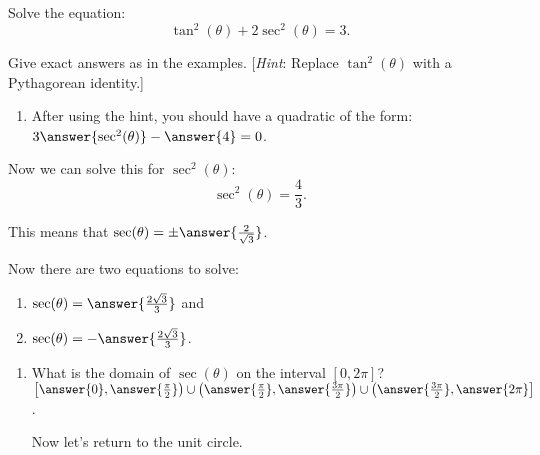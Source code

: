 \documentclass{ximera}
\author{Elizabeth Campolongo}
\begin{document}
\begin{exercise}
Solve the equation:
$$\tan^2(\theta) + 2\sec^2(\theta)=3.$$

Give exact answers as in the examples. [\textit{Hint}: Replace $\tan^2(\theta)$ with a Pythagorean identity.]

\begin{enumerate}
\item After using the hint, you should have a quadratic of the form: \smallskip\\

 $3\answer{\sec^2(\theta)} -\answer{4} = 0$.
 \end{enumerate}
\begin{exercise}
Now we can solve this for $\sec^2(\theta)$:
$$
\sec^2(\theta) = \frac{4}{3}. 
$$

This means that $\sec(\theta) = \pm\answer{\frac{2}{\sqrt{3}}}$.

\begin{exercise}
Now there are two equations to solve:
\begin{enumerate}
\item $\sec(\theta) = \answer{\frac{2\sqrt{3}}{3}}$ and

\item $\sec(\theta) = -\answer{\frac{2\sqrt{3}}{3}}$.
\end{enumerate}

\begin{exercise}
\begin{enumerate}
\item What is the domain of $\sec(\theta)$ on the interval $[0, 2\pi]$?\smallskip \\
$\left[\answer{0},\answer{\frac{\pi}{2}}\right) \cup \left(\answer{\frac{\pi}{2}}, \answer{\frac{3\pi}{2}}\right) \cup \left(\answer{\frac{3\pi}{2}},\answer{2\pi}\right]$.


\bigskip
Now let's return to the unit circle. 
\begin{image}
\end{image}
\end{enumerate}
\end{exercise}
\end{exercise}
\end{exercise}
\end{exercise}
\end{document}

